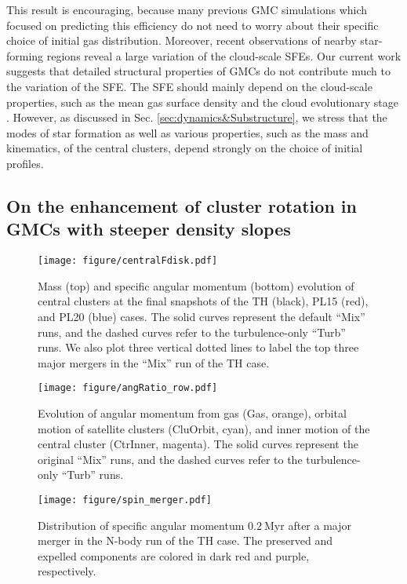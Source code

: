 \documentclass[fleqn,usenatbib]{mnras}
\begin{document}
This result is encouraging, because many previous GMC simulations which focused on predicting this efficiency do not need to worry about their specific choice of initial gas distribution.
Moreover, recent observations of nearby star-forming regions \citep[e.g.][]{zuckerman_models_1974, krumholz_slow_2007, wu_properties_2010, evans_star_2014, vutisalchavakul_star_2016, heyer_rate_2016, lee_observational_2016} reveal a large variation of the cloud-scale SFEs.
Our current work suggests that detailed structural properties of GMCs do not contribute much to the variation of the SFE.
The SFE should mainly depend on the cloud-scale properties, such as the mean gas surface density and the cloud evolutionary stage \citep{grudic_nature_2019}.
However, as discussed in Sec. \ref{sec:dynamics&Substructure}, we stress that the modes of star formation as well as various properties, such as the mass and kinematics, of the central clusters, depend strongly on the choice of initial profiles.

\subsection{On the enhancement of cluster rotation in GMCs with steeper density slopes}
\label{sec:physicalOriginAM}

\begin{figure}
	\texttt{[image: figure/centralFdisk.pdf]}
	\caption{Mass (top) and specific angular momentum (bottom) evolution of central clusters at the final snapshots of the TH (black), PL15 (red), and PL20 (blue) cases. The solid curves represent the default ``Mix'' runs, and the dashed curves refer to the turbulence-only ``Turb'' runs. We also plot three vertical dotted lines to label the top three major mergers in the ``Mix'' run of the TH case.
	}
	\label{fig:centralFdisk}
\end{figure}


\begin{figure*}
\texttt{[image: figure/angRatio\_row.pdf]}
\caption{Evolution of angular momentum from gas (Gas, orange), orbital motion of satellite clusters (CluOrbit, cyan), and inner motion of the central cluster (CtrInner, magenta). The solid curves represent the original ``Mix'' runs, and the dashed curves refer to the turbulence-only ``Turb'' runs.
}
  \label{fig:angRatio}
\end{figure*}

\begin{figure}
	\texttt{[image: figure/spin\_merger.pdf]}
	\caption{Distribution of specific angular momentum $0.2\ \mathrm{Myr}$ after a major merger in the N-body run of the TH case. The preserved and expelled components are colored in dark red and purple, respectively.}
	\label{fig:spinMerger}
\end{figure}
\end{document}
